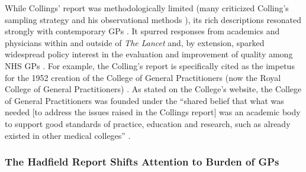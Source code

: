 \documentclass[12pt]{article}
\begin{document}
While Collings' report was methodologically limited (many criticized Colling's sampling strategy and his observational methods \citep{petcheyCollingsReportGeneral1995}), its rich descriptions resonated strongly with contemporary GPs \citep{honigsbaumDivisionBritishMedicine1979}. It spurred responses from academics and physicians within \citep{huntSCOPEDEVELOPMENTGENERAL1955} and outside of \emph{The Lancet} \citep{anthonyCrossroads1950, dawsonCrossroads1950, laskCrossroads1950, pirrieCrossroads1950, sanguinettiCrossroads1950} and, by extension, sparked widespread policy interest in the evaluation and improvement of quality among NHS GPs \citep{petcheyCollingsReportGeneral1995}. For example, the Colling's report is specifically cited as the impetus for the 1952 creation of the College of General Practitioners (now the Royal College of General Practitioners) \citep{royalcollegeofgeneralpractitionersHistoryCollege}. As stated on the College's website, the College of General Practitioners was founded under the ``shared belief that what was needed [to address the issues raised in the Collings report] was an academic body to support good standards of practice, education and research, such as already existed in other medical colleges'' \citep{royalcollegeofgeneralpractitionersHistoryCollege}.

\subsubsection{The Hadfield Report Shifts Attention to Burden of GPs}
\end{document}

